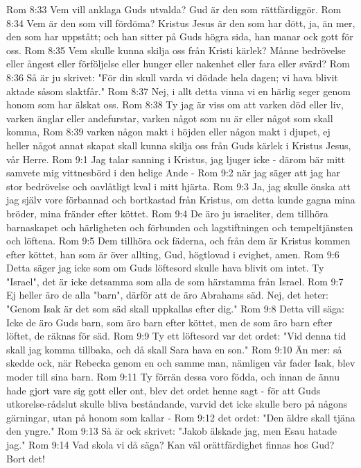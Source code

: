 Rom 8:33  Vem vill anklaga Guds utvalda? Gud är den som rättfärdiggör.
Rom 8:34  Vem är den som vill fördöma? Kristus Jesus är den som har dött, ja, än mer, den som har uppstått; och han sitter på Guds högra sida, han manar ock gott för oss.
Rom 8:35  Vem skulle kunna skilja oss från Kristi kärlek? Månne bedrövelse eller ångest eller förföljelse eller hunger eller nakenhet eller fara eller svärd?
Rom 8:36  Så är ju skrivet: "För din skull varda vi dödade hela dagen; vi hava blivit aktade såsom slaktfår."
Rom 8:37  Nej, i allt detta vinna vi en härlig seger genom honom som har älskat oss.
Rom 8:38  Ty jag är viss om att varken död eller liv, varken änglar eller andefurstar, varken något som nu är eller något som skall komma,
Rom 8:39  varken någon makt i höjden eller någon makt i djupet, ej heller något annat skapat skall kunna skilja oss från Guds kärlek i Kristus Jesus, vår Herre.
Rom 9:1  Jag talar sanning i Kristus, jag ljuger icke - därom bär mitt samvete mig vittnesbörd i den helige Ande -
Rom 9:2  när jag säger att jag har stor bedrövelse och oavlåtligt kval i mitt hjärta.
Rom 9:3  Ja, jag skulle önska att jag själv vore förbannad och bortkastad från Kristus, om detta kunde gagna mina bröder, mina fränder efter köttet.
Rom 9:4  De äro ju israeliter, dem tillhöra barnaskapet och härligheten och förbunden och lagstiftningen och tempeltjänsten och löftena.
Rom 9:5  Dem tillhöra ock fäderna, och från dem är Kristus kommen efter köttet, han som är över allting, Gud, högtlovad i evighet, amen.
Rom 9:6  Detta säger jag icke som om Guds löftesord skulle hava blivit om intet. Ty "Israel", det är icke detsamma som alla de som härstamma från Israel.
Rom 9:7  Ej heller äro de alla "barn", därför att de äro Abrahams säd. Nej, det heter: "Genom Isak är det som säd skall uppkallas efter dig."
Rom 9:8  Detta vill säga: Icke de äro Guds barn, som äro barn efter köttet, men de som äro barn efter löftet, de räknas för säd.
Rom 9:9  Ty ett löftesord var det ordet: "Vid denna tid skall jag komma tillbaka, och då skall Sara hava en son."
Rom 9:10  Än mer: så skedde ock, när Rebecka genom en och samme man, nämligen vår fader Isak, blev moder till sina barn.
Rom 9:11  Ty förrän dessa voro födda, och innan de ännu hade gjort vare sig gott eller ont, blev det ordet henne sagt - för att Guds utkorelse-rådslut skulle bliva beståndande, varvid det icke skulle bero på någons gärningar, utan på honom som kallar -
Rom 9:12  det ordet: "Den äldre skall tjäna den yngre."
Rom 9:13  Så är ock skrivet: "Jakob älskade jag, men Esau hatade jag."
Rom 9:14  Vad skola vi då säga? Kan väl orättfärdighet finnas hos Gud? Bort det!
